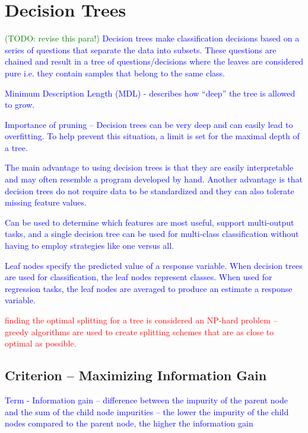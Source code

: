 \section{Decision Trees}

\textcolor{blue}{\textcolor{green}{(TODO: revise this para!)} Decision trees make classification decisions based on a series of questions that separate the data into subsets. These questions are chained and result in a tree of questions/decisions where the leaves are considered pure i.e. they contain samples that belong to the same class.}

\textcolor{blue}{Minimum Description Length (MDL) - describes how ``deep'' the tree is allowed to grow.}

\textcolor{blue}{Importance of pruning -- Decision trees can be very deep and can easily lead to overfitting. To help prevent this situation, a limit is set for the maximal depth of a tree. }

\textcolor{blue}{The main advantage to using decision trees is that they are easily interpretable and may often resemble a program developed by hand. Another advantage is that decision trees do not require data to be standardized and they can also tolerate missing feature values.}

\textcolor{blue}{Can be used to determine which features are most useful, support multi-output tasks, and a single decision tree can be used for multi-class classification without having to employ strategies like one versus all.}

\textcolor{blue}{Leaf nodes specify the predicted value of a response variable. When decision trees are used for classification, the leaf nodes represent classes. When used for regression tasks, the leaf nodes are averaged to produce an estimate a response variable.}

\textcolor{red}{finding the optimal splitting for a tree is considered an NP-hard problem -- greedy algorithms are used to create splitting schemes that are as close to optimal as possible.}


\subsection{Criterion -- Maximizing Information Gain}

\textcolor{blue}{Term - Information gain -- difference between the impurity of the parent node and the sum of the child node impurities -- the lower the impurity of the child nodes compared to the parent node, the higher the information gain}

